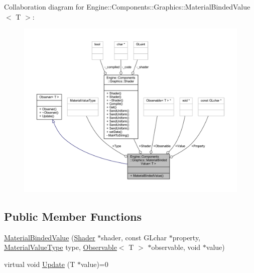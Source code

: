 Collaboration diagram for Engine\+:\+:Components\+:\+:Graphics\+:\+:Material\+Binded\+Value$<$ T $>$\+:
\nopagebreak
\begin{figure}[H]
\begin{center}
\leavevmode
\includegraphics[width=350pt]{classEngine_1_1Components_1_1Graphics_1_1MaterialBindedValue__coll__graph}
\end{center}
\end{figure}
\subsection*{Public Member Functions}
\begin{DoxyCompactItemize}
\item 
\mbox{\hyperlink{classEngine_1_1Components_1_1Graphics_1_1MaterialBindedValue_ad2532a61c245e1d557552e2180e08e72}{Material\+Binded\+Value}} (\mbox{\hyperlink{classEngine_1_1Components_1_1Graphics_1_1Shader}{Shader}} $\ast$shader, const G\+Lchar $\ast$property, \mbox{\hyperlink{namespaceEngine_1_1Components_1_1Graphics_a44f5a2b57ee82aed849896c8311e403b}{Material\+Value\+Type}} type, \mbox{\hyperlink{classObservable}{Observable}}$<$ T $>$ $\ast$observable, void $\ast$value)
\item 
virtual void \mbox{\hyperlink{classObserver_a3440221897a56f77975c504b0797c0d5}{Update}} (T $\ast$value)=0
\end{DoxyCompactItemize}
